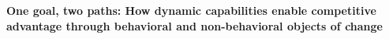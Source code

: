 \documentclass[review,fleqn]{elsarticle}\usepackage[]{graphicx}\usepackage[]{color}
\begin{document}








{\large \bf One goal, two paths: How dynamic capabilities enable competitive advantage through behavioral and non-behavioral objects of change}\\
\newline 
\end{document}
